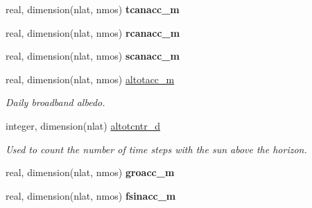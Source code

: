 \begin{DoxyCompactItemize}
\item 
\hypertarget{structctem__statevars_1_1veg__rot_a3f716be14168096f9c7827c9f71dfdea}{}real, dimension(nlat, nmos) {\bfseries tcanacc\+\_\+m}\label{structctem__statevars_1_1veg__rot_a3f716be14168096f9c7827c9f71dfdea}

\item 
\hypertarget{structctem__statevars_1_1veg__rot_a5fda6594c9690b95a8320e7246d29698}{}real, dimension(nlat, nmos) {\bfseries rcanacc\+\_\+m}\label{structctem__statevars_1_1veg__rot_a5fda6594c9690b95a8320e7246d29698}

\item 
\hypertarget{structctem__statevars_1_1veg__rot_a101c3c32798ace1a12c89d11ce596d35}{}real, dimension(nlat, nmos) {\bfseries scanacc\+\_\+m}\label{structctem__statevars_1_1veg__rot_a101c3c32798ace1a12c89d11ce596d35}

\item 
\hypertarget{structctem__statevars_1_1veg__rot_a52859cba5745bd6a80b68e36b140f5cf}{}real, dimension(nlat, nmos) \hyperlink{structctem__statevars_1_1veg__rot_a52859cba5745bd6a80b68e36b140f5cf}{altotacc\+\_\+m}\label{structctem__statevars_1_1veg__rot_a52859cba5745bd6a80b68e36b140f5cf}

\begin{DoxyCompactList}\small\item\em Daily broadband albedo. \end{DoxyCompactList}\item 
\hypertarget{structctem__statevars_1_1veg__rot_a00d304f070c0672bdd56893d0249912f}{}integer, dimension(nlat) \hyperlink{structctem__statevars_1_1veg__rot_a00d304f070c0672bdd56893d0249912f}{altotcntr\+\_\+d}\label{structctem__statevars_1_1veg__rot_a00d304f070c0672bdd56893d0249912f}

\begin{DoxyCompactList}\small\item\em Used to count the number of time steps with the sun above the horizon. \end{DoxyCompactList}\item 
\hypertarget{structctem__statevars_1_1veg__rot_aa84191681393208bb6aeb9ff1b9f7375}{}real, dimension(nlat, nmos) {\bfseries groacc\+\_\+m}\label{structctem__statevars_1_1veg__rot_aa84191681393208bb6aeb9ff1b9f7375}

\item 
\hypertarget{structctem__statevars_1_1veg__rot_aa408cd77b8ea9bc263d25cdd77a7c89a}{}real, dimension(nlat, nmos) {\bfseries fsinacc\+\_\+m}\label{structctem__statevars_1_1veg__rot_aa408cd77b8ea9bc263d25cdd77a7c89a}


\end{DoxyCompactItemize}
